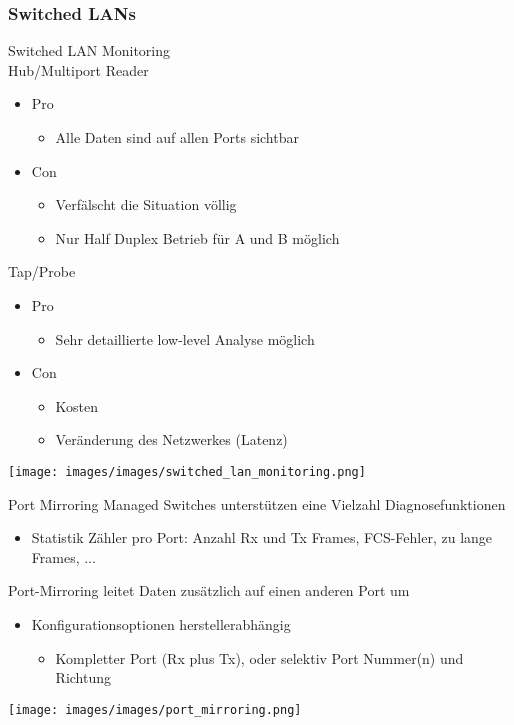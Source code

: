 \subsubsection*{Switched LANs}


\begin{concept}{Switched LAN Monitoring}\\
    Hub/Multiport Reader
    \begin{itemize}
        \item Pro
        \begin{itemize}
            \item Alle Daten sind auf allen Ports sichtbar
        \end{itemize}
        \item Con
        \begin{itemize}
            \item Verfälscht die Situation völlig
            \item Nur Half Duplex Betrieb für A und B möglich
        \end{itemize}
    \end{itemize}
    Tap/Probe
    \begin{itemize}
        \item Pro
        \begin{itemize}
            \item Sehr detaillierte low-level Analyse möglich
        \end{itemize}
        \item Con
        \begin{itemize}
            \item Kosten
            \item Veränderung des Netzwerkes (Latenz)
        \end{itemize}
    \end{itemize}
\end{concept}

\texttt{[image: images/images/switched\_lan\_monitoring.png]}

\begin{concept}{Port Mirroring}
    Managed Switches unterstützen eine Vielzahl Diagnosefunktionen
    \begin{itemize}
        \item Statistik Zähler pro Port: Anzahl Rx und Tx Frames, FCS-Fehler, zu lange Frames, ...
    \end{itemize}
    Port-Mirroring leitet Daten zusätzlich auf einen anderen Port um
    \begin{itemize}
        \item Konfigurationsoptionen herstellerabhängig
        \begin{itemize}
            \item Kompletter Port (Rx plus Tx), oder selektiv Port Nummer(n) und Richtung
        \end{itemize}
    \end{itemize}
        \texttt{[image: images/images/port\_mirroring.png]}
\end{concept}

